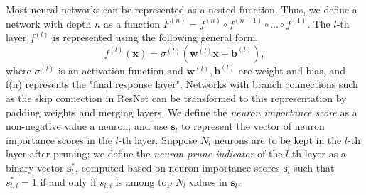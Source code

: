 \documentclass[10pt,twocolumn,letterpaper]{article}
\newtheorem{definition}[theorem]{Definition}
\def\mb{\mathbf}
\begin{document}
Most neural networks can be represented as a nested function. Thus, we define a network with depth $n$ as a function $F^{(n)}=f^{(n)}\circ f^{(n-1)}\circ\dots\circ f^{(1)}$. The $l$-th layer $f^{(l)}$ is represented using the following general form,
\begin{equation}
\label{proof1_objective_2}
f^{(l)}(\mb x)=\sigma^{(l)}(\mb w^{(l)}\mb x+\mathbf b^{(l)}),
\end{equation}
where $\sigma^{(l)}$ is an activation function and $\mb w^{(l)},\mb b^{(l)}$ are weight and bias, and f(n) represents the "final response layer".
Networks with branch connections such as the skip connection in ResNet can be transformed to this representation by padding weights and merging layers. %
We define the \textit{neuron importance score} as a non-negative value \wrt a neuron, and use $\mb s_l$ to represent the vector of neuron importance scores  in the $l$-th layer. Suppose $N_l$ neurons are to be kept in the $l$-th layer after pruning; we define the \textit{neuron prune indicator} of the $l$-th layer as a binary vector $\mb s^*_l$, computed based on neuron importance scores $\mb s_l$ such that $s^*_{l,i}=1$ if and only if $s_{l,i}$ is among top $N_l$ values in $\mb s_l$. 
\end{document}
